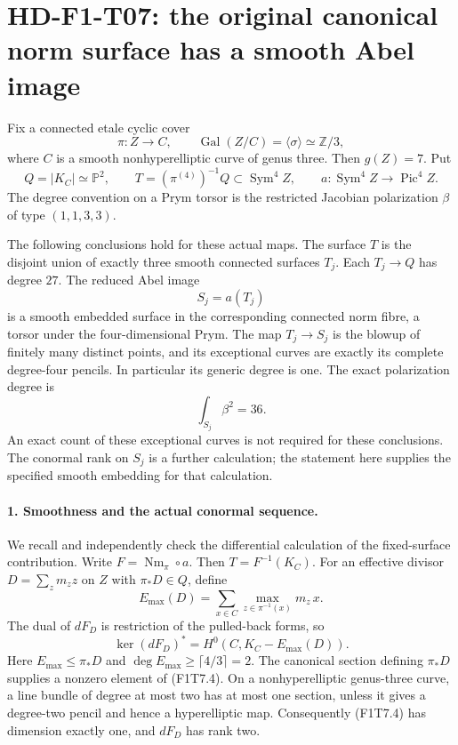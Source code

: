 \section{HD-F1-T07: the original canonical norm surface has a smooth Abel image}
\label{sec:f1-norm-abel-embedding}

Fix a connected etale cyclic cover
\[
 \pi:Z\longrightarrow C,\qquad \operatorname{Gal}(Z/C)=\langle\sigma\rangle
       \simeq\mathbb Z/3,
\]
where $C$ is a smooth nonhyperelliptic curve of genus three.
Then $g(Z)=7$. Put
\[
 Q=|K_C|\simeq\mathbb P^2,\qquad
 T=(\pi^{(4)})^{-1}Q\subset\operatorname{Sym}^4Z,\qquad
 a:\operatorname{Sym}^4Z\longrightarrow\operatorname{Pic}^4Z.
 \tag{F1T7.1}
\]
The degree convention on a Prym torsor is the restricted
Jacobian polarization $\beta$ of type $(1,1,3,3)$.

The following conclusions hold for these actual maps. The surface
$T$ is the disjoint union of exactly three smooth connected
surfaces $T_j$. Each $T_j\to Q$ has degree $27$. The reduced
Abel image
\[
                     S_j=a(T_j)
 \tag{F1T7.2}
\]
is a smooth embedded surface in the corresponding connected norm
fibre, a torsor under the four-dimensional Prym.
The map $T_j\to S_j$ is the blowup of finitely many distinct
points, and its exceptional curves are exactly its complete
degree-four pencils. In particular its generic degree is one.
The exact polarization degree is
\[
                       \int_{S_j}\beta^2=36.
 \tag{F1T7.3}
\]
An exact count of these exceptional curves is not required for
these conclusions. The conormal rank on $S_j$ is a further
calculation; the statement here supplies the specified smooth
embedding for that calculation.

\paragraph{1. Smoothness and the actual conormal sequence.}
We recall and independently check the differential calculation
of the fixed-surface contribution. Write
$F=\operatorname{Nm}_\pi\circ a$. Then $T=F^{-1}(K_C)$.
For an effective divisor $D=\sum_zm_z z$ on $Z$ with
$\pi_*D\in Q$, define
\[
 E_{\max}(D)=\sum_{x\in C}
                 \max_{z\in\pi^{-1}(x)}m_z\,x.
\]
The dual of $dF_D$ is restriction of the pulled-back forms, so
\[
 \ker(dF_D)^*
       =H^0(C,K_C-E_{\max}(D)).
 \tag{F1T7.4}
\]
Here $E_{\max}\leq\pi_*D$ and
$\deg E_{\max}\geq\lceil4/3\rceil=2$.
The canonical section defining $\pi_*D$ supplies a nonzero
element of (F1T7.4). On a nonhyperelliptic genus-three curve,
a line bundle of degree at most two has at most one section,
unless it gives a degree-two pencil and hence a hyperelliptic
map. Consequently (F1T7.4) has dimension exactly one, and
$dF_D$ has rank two.

